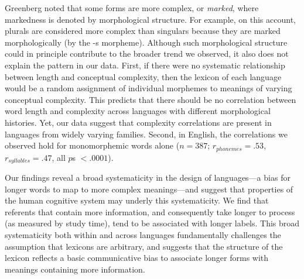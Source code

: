 \documentclass[12pt]{article}
\begin{document}

Greenberg\cite{greenberg1966} noted that some forms are more complex, or \emph{marked}, where markedness is denoted by morphological structure. For example, on this account, plurals are considered more complex than singulars because they are marked morphologically (by the -s morpheme). Although such morphological structure could in principle contribute to the broader trend we observed, it also does not explain the pattern in our data. First, if there were no systematic relationship between length and conceptual complexity, then the lexicon of each language would be a random assignment of individual morphemes to meanings of varying conceptual complexity. This predicts that there should be no correlation between word length and complexity across languages with different morphological histories. Yet, our data suggest that complexity correlations are present in languages from widely varying families. Second, in English, the correlations we observed hold for monomorphemic words alone ($n = 387$; $r_{phonemes} = .53$, $r_{syllables} = .47$, all $p$s $< .0001$).

Our findings reveal a broad systematicity in the design of  languages---a bias for longer words to map to more complex meanings---and suggest that properties of the human cognitive system may underly this systematicity. We find that referents that contain more information, and consequently take longer to process (as measured by study time), tend to be associated with longer labels. This broad systematicity both within and across languages fundamentally challenges the assumption that lexicons are arbitrary, and suggests that the structure of the lexicon reflects a basic communicative bias to associate longer forms with meanings containing more information.
\end{document}

